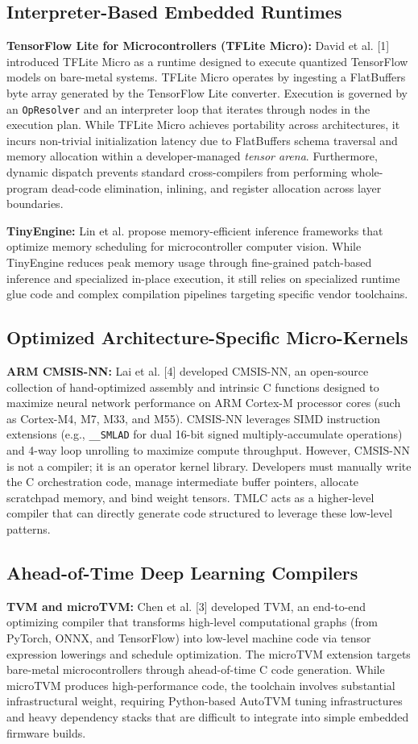 \documentclass[11pt,a4paper]{article}
\begin{document}
\subsection{Interpreter-Based Embedded Runtimes}
\textbf{TensorFlow Lite for Microcontrollers (TFLite Micro):} David et al. [1] introduced TFLite Micro as a runtime designed to execute quantized TensorFlow models on bare-metal systems. TFLite Micro operates by ingesting a FlatBuffers byte array generated by the TensorFlow Lite converter. Execution is governed by an \texttt{OpResolver} and an interpreter loop that iterates through nodes in the execution plan. While TFLite Micro achieves portability across architectures, it incurs non-trivial initialization latency due to FlatBuffers schema traversal and memory allocation within a developer-managed \textit{tensor arena}. Furthermore, dynamic dispatch prevents standard cross-compilers from performing whole-program dead-code elimination, inlining, and register allocation across layer boundaries.

\textbf{TinyEngine:} Lin et al. propose memory-efficient inference frameworks that optimize memory scheduling for microcontroller computer vision. While TinyEngine reduces peak memory usage through fine-grained patch-based inference and specialized in-place execution, it still relies on specialized runtime glue code and complex compilation pipelines targeting specific vendor toolchains.

\subsection{Optimized Architecture-Specific Micro-Kernels}
\textbf{ARM CMSIS-NN:} Lai et al. [4] developed CMSIS-NN, an open-source collection of hand-optimized assembly and intrinsic C functions designed to maximize neural network performance on ARM Cortex-M processor cores (such as Cortex-M4, M7, M33, and M55). CMSIS-NN leverages SIMD instruction extensions (e.g., \texttt{\_\_SMLAD} for dual 16-bit signed multiply-accumulate operations) and 4-way loop unrolling to maximize compute throughput. However, CMSIS-NN is not a compiler; it is an operator kernel library. Developers must manually write the C orchestration code, manage intermediate buffer pointers, allocate scratchpad memory, and bind weight tensors. TMLC acts as a higher-level compiler that can directly generate code structured to leverage these low-level patterns.

\subsection{Ahead-of-Time Deep Learning Compilers}
\textbf{TVM and microTVM:} Chen et al. [3] developed TVM, an end-to-end optimizing compiler that transforms high-level computational graphs (from PyTorch, ONNX, and TensorFlow) into low-level machine code via tensor expression lowerings and schedule optimization. The microTVM extension targets bare-metal microcontrollers through ahead-of-time C code generation. While microTVM produces high-performance code, the toolchain involves substantial infrastructural weight, requiring Python-based AutoTVM tuning infrastructures and heavy dependency stacks that are difficult to integrate into simple embedded firmware builds.
\end{document}
